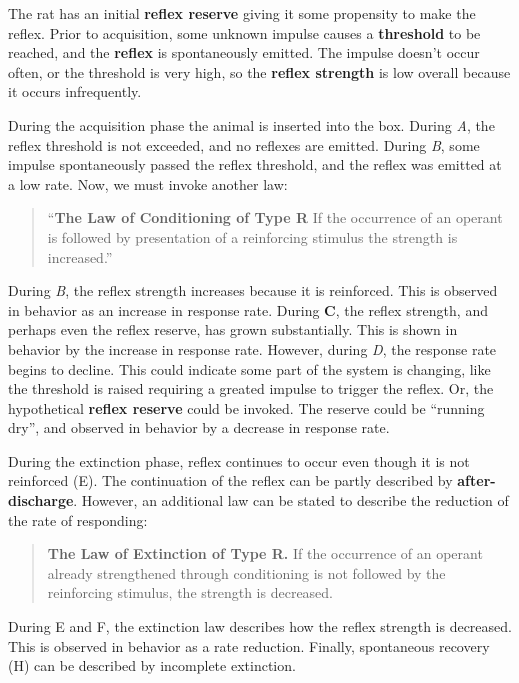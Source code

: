 \documentclass[
  oneside,
  12pt]{crumpbook}
\begin{document}
The rat has an initial \textbf{reflex reserve} giving it some propensity to make the reflex. Prior to acquisition, some unknown impulse causes a \textbf{threshold} to be reached, and the \textbf{reflex} is spontaneously emitted. The impulse doesn't occur often, or the threshold is very high, so the \textbf{reflex strength} is low overall because it occurs infrequently.

During the acquisition phase the animal is inserted into the box. During \emph{A}, the reflex threshold is not exceeded, and no reflexes are emitted. During \emph{B}, some impulse spontaneously passed the reflex threshold, and the reflex was emitted at a low rate. Now, we must invoke another law:

\begin{quote}
``\textbf{The Law of Conditioning of Type R} If the occurrence of an operant is followed by presentation of a reinforcing stimulus the strength is increased.''
\end{quote}

During \emph{B}, the reflex strength increases because it is reinforced. This is observed in behavior as an increase in response rate. During \textbf{C}, the reflex strength, and perhaps even the reflex reserve, has grown substantially. This is shown in behavior by the increase in response rate. However, during \emph{D}, the response rate begins to decline. This could indicate some part of the system is changing, like the threshold is raised requiring a greated impulse to trigger the reflex. Or, the hypothetical \textbf{reflex reserve} could be invoked. The reserve could be ``running dry'', and observed in behavior by a decrease in response rate.

During the extinction phase, reflex continues to occur even though it is not reinforced (E). The continuation of the reflex can be partly described by \textbf{after-discharge}. However, an additional law can be stated to describe the reduction of the rate of responding:

\begin{quote}
\textbf{The Law of Extinction of Type R.} If the occurrence of an operant already strengthened through conditioning is not followed by the reinforcing stimulus, the strength is decreased.
\end{quote}

During E and F, the extinction law describes how the reflex strength is decreased. This is observed in behavior as a rate reduction. Finally, spontaneous recovery (H) can be described by incomplete extinction.
\end{document}
